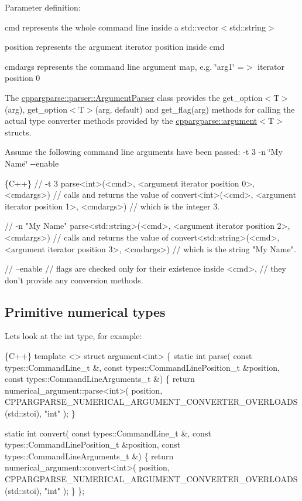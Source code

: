 Parameter definition\+:
\begin{DoxyItemize}
\item {\ttfamily cmd} represents the whole command line inside a {\ttfamily std\+::vector$<$std\+::string$>$}
\item {\ttfamily position} represents the argument iterator position inside {\ttfamily cmd}
\item {\ttfamily cmdargs} represents the command line argument map, e.\+g. {\ttfamily \char`\"{}arg1\char`\"{} =$>$ iterator position 0}
\end{DoxyItemize}

The {\ttfamily \hyperlink{classcppargparse_1_1parser_1_1ArgumentParser}{cppargparse\+::parser\+::\+Argument\+Parser}} class provides the {\ttfamily get\+\_\+option$<$T$>$(arg)}, {\ttfamily get\+\_\+option$<$T$>$(arg, default)} and {\ttfamily get\+\_\+flag(arg)} methods for calling the actual type converter methods provided by the {\ttfamily \hyperlink{structcppargparse_1_1argument}{cppargparse\+::argument}$<$T$>$} structs.

Assume the following command line arguments have been passed\+: {\ttfamily -\/t 3 -\/n \char`\"{}\+My Name\char`\"{} -\/-\/enable} 
\begin{DoxyCode}
\{C++\}
// -t 3
parse<int>(<cmd>, <argument iterator position 0>, <cmdargs>)
// calls and returns the value of
convert<int>(<cmd>, <argument iterator position 1>, <cmdargs>)
// which is the integer 3.


// -n "My Name"
parse<std::string>(<cmd>, <argument iterator position 2>, <cmdargs>)
// calls and returns the value of
convert<std::string>(<cmd>, <argument iterator position 3>, <cmdargs>)
// which is the string "My Name".


// --enable
// flags are checked only for their existence inside <cmd>,
// they don't provide any conversion methods.
\end{DoxyCode}


\subsection*{Primitive numerical types}

Let\textquotesingle{}s look at the {\ttfamily int} type, for example\+: 
\begin{DoxyCode}
\{C++\}
template <>
struct argument<int>
\{
    static int parse(
            const types::CommandLine\_t &,
            const types::CommandLinePosition\_t &position,
            const types::CommandLineArguments\_t &)
    \{
        return numerical\_argument::parse<int>(
            position,
            CPPARGPARSE\_NUMERICAL\_ARGUMENT\_CONVERTER\_OVERLOADS(std::stoi),
            "int"
        );
    \}

    static int convert(
            const types::CommandLine\_t &,
            const types::CommandLinePosition\_t &position,
            const types::CommandLineArguments\_t &)
    \{
        return numerical\_argument::convert<int>(
            position,
            CPPARGPARSE\_NUMERICAL\_ARGUMENT\_CONVERTER\_OVERLOADS(std::stoi),
            "int"
        );
    \}
\};
\end{DoxyCode}


